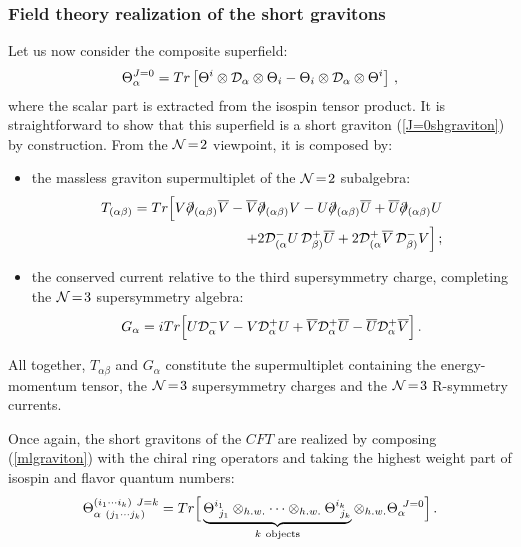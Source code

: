 \documentclass[a4paper,12pt]{article}
\begin{document}
\subsubsection{Field theory realization of the short gravitons}
Let us now consider the composite superfield:
\begin{equation}
  \Theta^{J=0}_\alpha=Tr\left[\Theta^i\otimes{\cal D}_\alpha\otimes
  \Theta_i-\Theta_i\otimes{\cal D}_\alpha\otimes\Theta^i\right]\,,
\label{mlgraviton}
\end{equation}
where the scalar part is extracted from the isospin tensor product.
It is straightforward to show that this superfield is a short
graviton (\ref{J=0shgraviton}) by construction.
From the ${\cal N}\!=\!2$ viewpoint, it is composed by:
\begin{itemize}
  \item the massless graviton supermultiplet of the ${\cal N}\!=\!2$
  subalgebra:
  \begin{eqnarray}
    T_{(\alpha\beta)}=Tr\Big[V\partial\!\!\!/_{(\alpha\beta)}\overline V
    -\overline V\partial\!\!\!/_{(\alpha\beta)}V
    -U\partial\!\!\!/_{(\alpha\beta)}\overline U
    +\overline U\partial\!\!\!/_{(\alpha\beta)}U\nonumber\\
    +2{\cal D}^-_{(\alpha}U\,{\cal D}^+_{\beta)}\overline U
    +2{\cal D}^+_{(\alpha}\overline V\,{\cal D}^-_{\beta)} V\Big]\,;
  \end{eqnarray}
  \item the conserved current relative to the third supersymmetry
  charge, completing the ${\cal N}\!=\!3$ supersymmetry algebra:
\begin{equation}
 G_\alpha=iTr\Big[U{\cal D}^-_\alpha V-V{\cal D}^+_\alpha U+
 \overline V{\cal D}^+_\alpha\overline U
 -\overline U{\cal D}^+_\alpha\overline V\Big]\,.
\end{equation}
\end{itemize}
All together, $T_{\alpha\beta}$ and $G_{\alpha}$ constitute the
supermultiplet containing the energy-momentum tensor, the ${\cal N}\!=\!3$
supersymmetry charges and the ${\cal N}\!=\!3$ R-symmetry currents.
\par
Once again, the short gravitons of the $CFT$ are realized by
composing (\ref{mlgraviton}) with the chiral
ring operators and taking the highest weight part of isospin
and flavor quantum numbers:
\begin{equation}
\Theta^{(i_1\cdots i_k)\ J=k}_{\alpha\ (j_1\cdots j_k)}=
Tr\Big[\underbrace{\Theta^{i_1}_{\ j_1}\otimes_{h.w.}
\cdots\otimes_{h.w.}\Theta^{i_k}_{\ j_k}}_{k\ {\rm objects}}
\otimes_{h.w.}\Theta^{\ J=0}_{\alpha}\Big]\,.
\label{shgraviton}
\end{equation}
\end{document}
